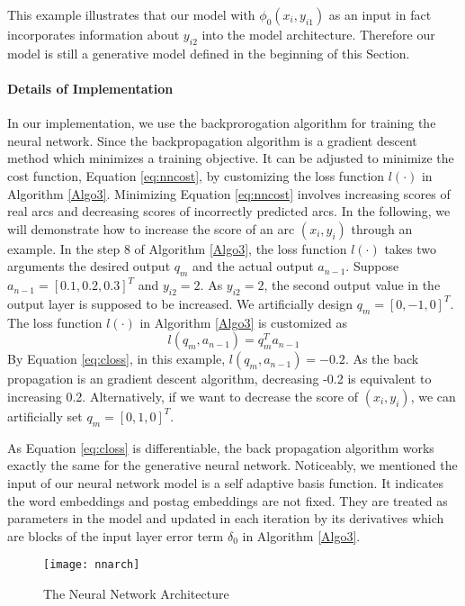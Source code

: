 This example illustrates that our model with $\phi_0(x_i,y_{i1})$ as an input in fact incorporates information about $y_{i2}$ into the model architecture. Therefore our model is still a generative model defined in the beginning of this Section.
\paragraph*{Details of Implementation}
In our implementation, we use the backprorogation algorithm for training the neural network.
Since the backpropagation algorithm is a gradient descent method which minimizes a training objective. It can be adjusted to minimize the cost function, Equation \ref{eq:nncost}, by customizing the loss function $l(\cdot)$ in Algorithm \ref{Algo3}. Minimizing Equation \ref{eq:nncost} involves increasing scores of real arcs and decreasing scores of incorrectly predicted arcs. In the following, we will demonstrate how to increase the score of an arc $(x_i,y_i)$ through an example. In the step 8 of Algorithm \ref{Algo3}, the loss function $l(\cdot)$ takes two arguments the desired output $q_m$ and the actual output $a_{n-1}$. Suppose $a_{n-1}=[0.1,0.2,0.3]^{T}$ and $y_{i2}=2$. As $y_{i2}=2$, the second output value in the output layer is supposed to be increased. We artificially design $q_m=[0,-1,0]^{T}$. The loss function $l(\cdot)$ in Algorithm \ref{Algo3} is customized as 
\begin{equation}
\label{eq:closs}
l(q_m,a_{n-1})=q_m^{T}a_{n-1}
\end{equation}
By Equation \ref{eq:closs}, in this example, $l(q_m,a_{n-1}) = -0.2$. As the back propagation is an gradient descent algorithm, decreasing -0.2 is equivalent to increasing 0.2. Alternatively, if we want to decrease the score of $(x_i,y_i)$, we can artificially set $q_m=[0,1,0]^{T}$.

As Equation \ref{eq:closs} is differentiable, the back propagation algorithm works exactly the same for the generative neural network. Noticeably, we mentioned the input of our neural network model is a self adaptive basis function. It indicates the word embeddings and postag embeddings are not fixed. They are treated as parameters in the model and updated in each iteration by its derivatives which are blocks of the input layer error term $\delta_0$ in Algorithm \ref{Algo3}. 


\begin{figure}
  \centering
    \texttt{[image: nnarch]}
  \caption{The Neural Network Architecture}
  \label{fig:nnarch}
\end{figure}


